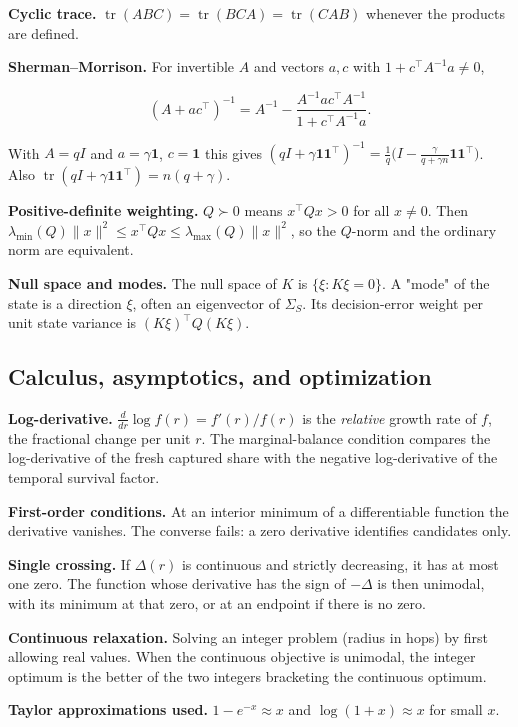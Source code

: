 \textbf{Cyclic trace.} $\operatorname{tr}(ABC)=\operatorname{tr}(BCA)=\operatorname{tr}(CAB)$ whenever the products are defined.

\textbf{Sherman--Morrison.} For invertible $A$ and vectors $a,c$ with $1+c^\top A^{-1}a\neq0$,

\[
(A+ac^\top)^{-1}=A^{-1}-\frac{A^{-1}ac^\top A^{-1}}{1+c^\top A^{-1}a}.
\]

  With $A=qI$ and $a=\gamma\mathbf 1$, $c=\mathbf 1$ this gives $(qI+\gamma\mathbf 1\mathbf 1^\top)^{-1}=\frac1q\big(I-\frac{\gamma}{q+\gamma n}\mathbf 1\mathbf 1^\top\big)$. Also $\operatorname{tr}(qI+\gamma\mathbf 1\mathbf 1^\top)=n(q+\gamma)$.

\textbf{Positive-definite weighting.} $Q\succ0$ means $x^\top Qx>0$ for all $x\neq0$. Then $\lambda_{\min}(Q)\|x\|^2\le x^\top Qx\le\lambda_{\max}(Q)\|x\|^2$, so the $Q$-norm and the ordinary norm are equivalent.

\textbf{Null space and modes.} The null space of $K$ is $\{\xi:K\xi=0\}$. A "mode" of the state is a direction $\xi$, often an eigenvector of $\Sigma_S$. Its decision-error weight per unit state variance is $(K\xi)^\top Q(K\xi)$.

\subsection{Calculus, asymptotics, and optimization}
\label{app:toolkit-7}
\textbf{Log-derivative.} $\frac{d}{dr}\log f(r)=f'(r)/f(r)$ is the \emph{relative} growth rate of $f$, the fractional change per unit $r$. The marginal-balance condition compares the log-derivative of the fresh captured share with the negative log-derivative of the temporal survival factor.

\textbf{First-order conditions.} At an interior minimum of a differentiable function the derivative vanishes. The converse fails: a zero derivative identifies candidates only.

\textbf{Single crossing.} If $\Delta(r)$ is continuous and strictly decreasing, it has at most one zero. The function whose derivative has the sign of $-\Delta$ is then unimodal, with its minimum at that zero, or at an endpoint if there is no zero.

\textbf{Continuous relaxation.} Solving an integer problem (radius in hops) by first allowing real values. When the continuous objective is unimodal, the integer optimum is the better of the two integers bracketing the continuous optimum.

\textbf{Taylor approximations used.} $1-e^{-x}\approx x$ and $\log(1+x)\approx x$ for small $x$.

